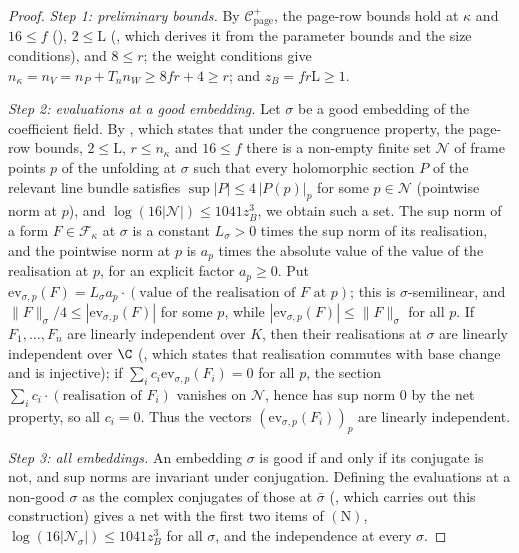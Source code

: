 \begin{proof}
\emph{Step 1: preliminary bounds.} By $\mathcal C^+_{\mathrm{page}}$, the page-row bounds hold at $\kappa$ and $16\le f$
(), $2\le\mathrm L$ (, which derives it from the
parameter bounds and the size conditions), and $8\le r$; the weight conditions give $n_\kappa=n_V=n_P+T_nn_W\ge8fr+4\ge r$; and
$z_B=fr\mathrm L\ge1$.

\emph{Step 2: evaluations at a good embedding.} Let $\sigma$ be a good embedding of the coefficient field. By
, which states that under the congruence property, the page-row
bounds, $2\le\mathrm L$, $r\le n_\kappa$ and $16\le f$ there is a non-empty finite set $\mathcal N$ of frame points $p$ of the
unfolding at $\sigma$ such that every holomorphic section $P$ of the relevant line bundle satisfies $\sup|P|\le4\,|P(p)|_p$
for some $p\in\mathcal N$ (pointwise norm at $p$), and $\log(16|\mathcal N|)\le1041z_B^3$, we obtain such a set. The sup norm
of a form $F\in\mathcal F_\kappa$ at $\sigma$ is a constant $L_\sigma>0$ times the sup norm of its realisation, and the pointwise norm
at $p$ is $a_p$ times the absolute value of the value of the realisation at $p$, for an explicit factor $a_p\ge0$. Put
$\mathrm{ev}_{\sigma,p}(F)=L_\sigma a_p\cdot(\text{value of the realisation of }F\text{ at }p)$; this is $\sigma$-semilinear, and
$\|F\|_\sigma/4\le|\mathrm{ev}_{\sigma,p}(F)|$ for some $p$, while $|\mathrm{ev}_{\sigma,p}(F)|\le\|F\|_\sigma$ for all $p$. If $F_1,\dots,F_n$ are
linearly independent over $K$, then their realisations at $\sigma$ are linearly independent over $\C$
(, which states that realisation commutes with base change and is
injective); if $\sum_ic_i\mathrm{ev}_{\sigma,p}(F_i)=0$ for all $p$, the section $\sum_ic_i\cdot(\text{realisation of }F_i)$ vanishes on
$\mathcal N$, hence has sup norm $0$ by the net property, so all $c_i=0$. Thus the vectors $(\mathrm{ev}_{\sigma,p}(F_i))_p$ are
linearly independent.

\emph{Step 3: all embeddings.} An embedding $\sigma$ is good if and only if its conjugate is not, and sup norms are
invariant under conjugation. Defining the evaluations at a non-good $\sigma$ as the complex conjugates of those at
$\bar\sigma$ (, which carries out this construction)
gives a net with the first two items of $(\mathrm N)$, $\log(16|\mathcal N_\sigma|)\le1041z_B^3$ for all $\sigma$, and the
independence at every $\sigma$.


\end{proof}

